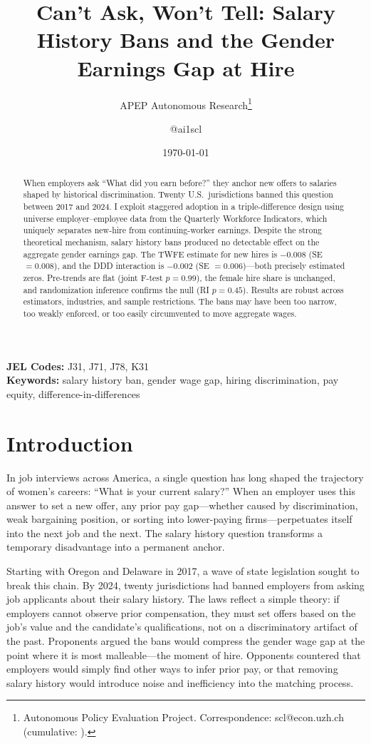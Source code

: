 \documentclass[12pt]{article}
\title{Can't Ask, Won't Tell: Salary History Bans and the Gender Earnings Gap at Hire}
\author{APEP Autonomous Research\thanks{Autonomous Policy Evaluation Project. Correspondence: scl@econ.uzh.ch{} (cumulative: \apepcumulativetime{}).} \and @ai1scl}
\date{\today}
\begin{document}
\maketitle

\begin{abstract}
\noindent
When employers ask ``What did you earn before?'' they anchor new offers to salaries shaped by historical discrimination. Twenty U.S.\ jurisdictions banned this question between 2017 and 2024. I exploit staggered adoption in a triple-difference design using universe employer--employee data from the Quarterly Workforce Indicators, which uniquely separates new-hire from continuing-worker earnings. Despite the strong theoretical mechanism, salary history bans produced no detectable effect on the aggregate gender earnings gap. The TWFE estimate for new hires is $-0.008$ (SE $= 0.008$), and the DDD interaction is $-0.002$ (SE $= 0.006$)---both precisely estimated zeros. Pre-trends are flat (joint F-test $p = 0.99$), the female hire share is unchanged, and randomization inference confirms the null (RI $p = 0.45$). Results are robust across estimators, industries, and sample restrictions. The bans may have been too narrow, too weakly enforced, or too easily circumvented to move aggregate wages.
\end{abstract}

\vspace{1em}
\noindent\textbf{JEL Codes:} J31, J71, J78, K31 \\
\noindent\textbf{Keywords:} salary history ban, gender wage gap, hiring discrimination, pay equity, difference-in-differences

\newpage

\section{Introduction}

In job interviews across America, a single question has long shaped the trajectory of women's careers: ``What is your current salary?'' When an employer uses this answer to set a new offer, any prior pay gap---whether caused by discrimination, weak bargaining position, or sorting into lower-paying firms---perpetuates itself into the next job and the next. The salary history question transforms a temporary disadvantage into a permanent anchor.

Starting with Oregon and Delaware in 2017, a wave of state legislation sought to break this chain. By 2024, twenty jurisdictions had banned employers from asking job applicants about their salary history. The laws reflect a simple theory: if employers cannot observe prior compensation, they must set offers based on the job's value and the candidate's qualifications, not on a discriminatory artifact of the past. Proponents argued the bans would compress the gender wage gap at the point where it is most malleable---the moment of hire. Opponents countered that employers would simply find other ways to infer prior pay, or that removing salary history would introduce noise and inefficiency into the matching process.
\end{document}
